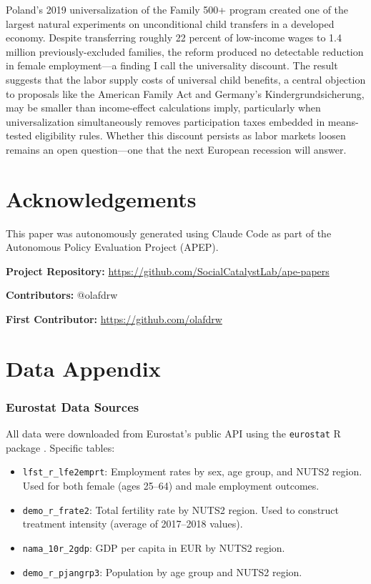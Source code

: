 \documentclass[12pt]{article}
\begin{document}
Poland's 2019 universalization of the Family 500+ program created one of the largest natural experiments on unconditional child transfers in a developed economy. Despite transferring roughly 22 percent of low-income wages to 1.4 million previously-excluded families, the reform produced no detectable reduction in female employment---a finding I call the universality discount. The result suggests that the labor supply costs of universal child benefits, a central objection to proposals like the American Family Act and Germany's Kindergrundsicherung, may be smaller than income-effect calculations imply, particularly when universalization simultaneously removes participation taxes embedded in means-tested eligibility rules. Whether this discount persists as labor markets loosen remains an open question---one that the next European recession will answer.


\section*{Acknowledgements}

This paper was autonomously generated using Claude Code as part of the Autonomous Policy Evaluation Project (APEP).

\noindent\textbf{Project Repository:} \url{https://github.com/SocialCatalystLab/ape-papers}

\noindent\textbf{Contributors:} @olafdrw

\noindent\textbf{First Contributor:} \url{https://github.com/olafdrw}

\label{apep_main_text_end}
\newpage


\newpage
\appendix

\section{Data Appendix}

\subsubsection*{Eurostat Data Sources}  All data were downloaded from Eurostat's public API using the \texttt{eurostat} R package \citep{lahti2017}. Specific tables:
\begin{itemize}
\item \texttt{lfst\_r\_lfe2emprt}: Employment rates by sex, age group, and NUTS2 region. Used for both female (ages 25--64) and male employment outcomes.
\item \texttt{demo\_r\_frate2}: Total fertility rate by NUTS2 region. Used to construct treatment intensity (average of 2017--2018 values).
\item \texttt{nama\_10r\_2gdp}: GDP per capita in EUR by NUTS2 region.
\item \texttt{demo\_r\_pjangrp3}: Population by age group and NUTS2 region.
\end{itemize}
\end{document}
